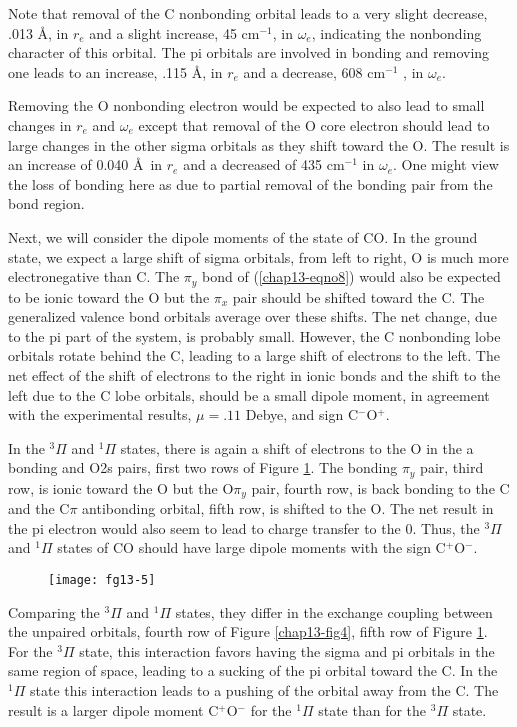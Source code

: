 Note that removal of the C nonbonding orbital leads to a very slight 
decrease, .013 \AA, in $r_e$ and a slight increase, 45 cm$^{-1}$, in 
$\omega_e$, indicating the nonbonding character of
this orbital. The pi orbitals are involved in bonding and removing one 
leads to an increase, .115 \AA, in $r_e$ and a decrease, 608 cm$^{-1}$ , 
in $\omega_e$.

Removing the O nonbonding electron would be expected to also lead to small
changes in $r_e$ and $\omega_e$ except that removal of the O core electron 
should lead to large changes in the other sigma orbitals as they shift 
toward the O.  The result is an increase of 0.040 \AA\ in $r_e$ and a 
decreased of 435 cm$^{-1}$ in $\omega_e$.  One might view the loss of 
bonding here as due to partial removal of the bonding pair from the bond 
region.

Next, we will consider the dipole moments of the state of CO.  In the
ground state, we expect a large shift of sigma orbitals, from left to
right, O is much more electronegative than C.  The $\pi_y$ bond of
(\ref{chap13-eqno8}) would also be expected to be ionic toward the O
but the $\pi_x$ pair should be shifted toward the C. The generalized
valence bond orbitals average over these shifts. The net change, due
to the pi part of the system, is probably small.  However, the C
nonbonding lobe orbitals rotate behind the C, leading to a large shift
of electrons to the left. The net effect of the shift of electrons to
the right in ionic bonds and the shift to the left due to the C lobe
orbitals, should be a small dipole moment, in agreement with the
experimental results, $\mu = .11$ Debye, and sign C$^-$O$^+$.

In the ${^3\Pi}$ and ${^1\Pi}$ states, there is again a shift of
electrons to the O in the a bonding and O2s pairs, first two rows of
Figure \ref{chap13-fig5}. The bonding $\pi_y$ pair, third row, is
ionic toward the O but the O$\pi_y$ pair, fourth row, is back bonding
to the C and the C$\pi$ antibonding orbital, fifth row, is shifted to
the O. The net result in the pi electron would also seem to lead to
charge transfer to the 0. Thus, the ${^3\Pi}$ and ${^1\Pi}$ states of
CO should have large dipole moments with the sign C$^+$O$^-$.

\begin{figure}
\texttt{[image: fg13-5]}
\caption{}
\label{chap13-fig5}
\end{figure}

Comparing the ${^3\Pi}$ and ${^1\Pi}$ states, they differ in the
exchange coupling between the unpaired orbitals, fourth row of Figure
\ref{chap13-fig4}, fifth row of Figure \ref{chap13-fig5}.  For the
${^3\Pi}$ state, this interaction favors having the sigma and pi
orbitals in the same region of space, leading to a sucking of the pi
orbital toward the C.  In the ${^1\Pi}$ state this interaction leads
to a pushing of the orbital away from the C.  The result is a larger
dipole moment C$^+$O$^-$ for the ${^1\Pi}$ state than for the
${^3\Pi}$ state.

